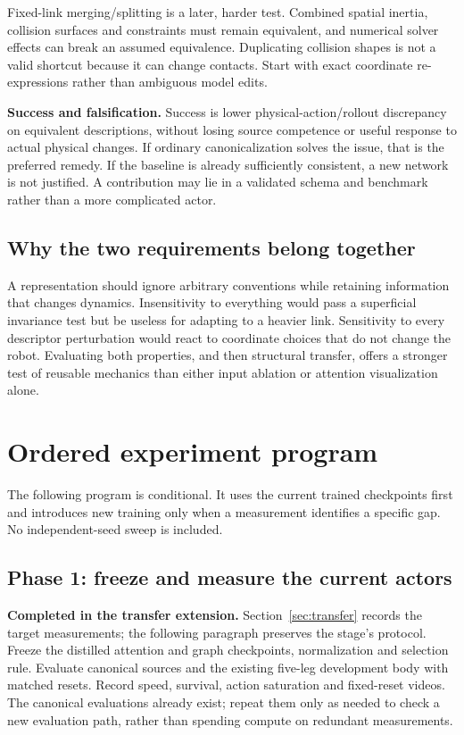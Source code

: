 \documentclass[11pt,letterpaper]{article}
\begin{document}
Fixed-link merging/splitting is a later, harder test. Combined spatial inertia,
collision surfaces and constraints must remain equivalent, and numerical solver
effects can break an assumed equivalence. Duplicating collision shapes is not a
valid shortcut because it can change contacts. Start with exact coordinate
re-expressions rather than ambiguous model edits.

\textbf{Success and falsification.} Success is lower physical-action/rollout
discrepancy on equivalent descriptions, without losing source competence or
useful response to actual physical changes. If ordinary canonicalization solves
the issue, that is the preferred remedy. If the baseline is already sufficiently
consistent, a new network is not justified. A contribution may lie in a validated
schema and benchmark rather than a more complicated actor.

\subsection{Why the two requirements belong together}
A representation should ignore arbitrary conventions while retaining information
that changes dynamics. Insensitivity to everything would pass a superficial
invariance test but be useless for adapting to a heavier link. Sensitivity to
every descriptor perturbation would react to coordinate choices that do not
change the robot. Evaluating both properties, and then structural transfer,
offers a stronger test of reusable mechanics than either input ablation or
attention visualization alone.

\section{Ordered experiment program}
\label{sec:plan}

The following program is conditional. It uses the current trained checkpoints
first and introduces new training only when a measurement identifies a specific
gap. No independent-seed sweep is included.

\subsection{Phase 1: freeze and measure the current actors}
\textbf{Completed in the transfer extension.} Section~\ref{sec:transfer} records
the target measurements; the following paragraph preserves the stage's protocol.
Freeze the distilled attention and graph checkpoints, normalization and selection
rule. Evaluate canonical sources and the existing five-leg development body with
matched resets. Record speed, survival, action saturation and fixed-reset videos.
The canonical evaluations already exist; repeat them only as needed to check a
new evaluation path, rather than spending compute on redundant measurements.
\end{document}
